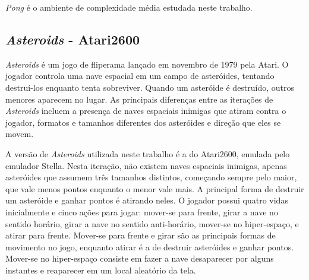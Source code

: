 \textit{Pong} é o ambiente de complexidade média estudada neste trabalho.

\subsection{\textit{Asteroids} - Atari2600}
\label{sec:asteroids}

\textit{Asteroids} é um jogo de fliperama
 lançado em novembro de 1979 pela
 Atari.
O jogador controla uma nave espacial em um campo de asteróides, tentando destruí-los enquanto tenta sobreviver.
Quando um asteróide é destruído, outros menores aparecem no lugar.
As principais diferenças entre as iterações de \textit{Asteroids} incluem a presença de naves espaciais inimigas que atiram contra o jogador, formatos e tamanhos diferentes dos asteróides e direção que eles se movem.

A versão de \textit{Asteroids} utilizada neste trabalho é a do Atari2600, emulada pelo emulador Stella.
Nesta iteração, não existem naves espaciais inimigas, apenas asteróides que assumem três tamanhos distintos, começando sempre pelo maior, que vale menos pontos enquanto o menor vale mais.
A principal forma de destruir um asteróide e ganhar pontos é atirando neles.
O jogador possui quatro vidas inicialmente e cinco ações para jogar: mover-se para frente, girar a nave no sentido horário, girar a nave no sentido anti-horário, mover-se no hiper-espaço, e atirar para frente.
Mover-se para frente e girar são as principais formas de movimento no jogo, enquanto atirar é a de destruir asteróides e ganhar pontos.
Mover-se no hiper-espaço consiste em fazer a nave desaparecer por alguns instantes e reaparecer em um local aleatório da tela.

